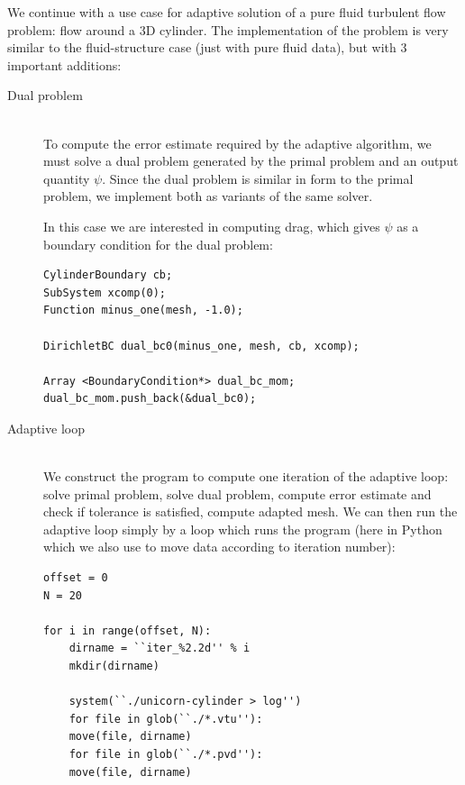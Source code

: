 We continue with a use case for adaptive solution of a pure fluid
turbulent flow problem: flow around a 3D cylinder. The implementation
of the problem is very similar to the fluid-structure case (just with
pure fluid data), but with 3 important additions:
\begin{description}
\item[Dual problem]
\ \\
To compute the error estimate required by the adaptive algorithm, we
must solve a dual problem generated by the primal problem and an
output quantity $\psi$. Since the dual problem is similar in form to
the primal problem, we implement both as variants of the same solver.

In this case we are interested in computing drag, which gives $\psi$
as a boundary condition for the dual problem:

\begin{lstlisting}
CylinderBoundary cb;
SubSystem xcomp(0); 
Function minus_one(mesh, -1.0);

DirichletBC dual_bc0(minus_one, mesh, cb, xcomp);

Array <BoundaryCondition*> dual_bc_mom;
dual_bc_mom.push_back(&dual_bc0);
\end{lstlisting}


\item[Adaptive loop]
\ \\
We construct the program to compute one iteration of the adaptive
loop: solve primal problem, solve dual problem, compute error estimate
and check if tolerance is satisfied, compute adapted mesh. We can then
run the adaptive loop simply by a loop which runs the program (here in
Python which we also use to move data according to iteration number):


\begin{lstlisting}
offset = 0
N = 20

for i in range(offset, N):
    dirname = ``iter_%2.2d'' % i
    mkdir(dirname)

    system(``./unicorn-cylinder > log'')
    for file in glob(``./*.vtu''):
    move(file, dirname)
    for file in glob(``./*.pvd''):
    move(file, dirname)
\end{lstlisting}


\end{description}
